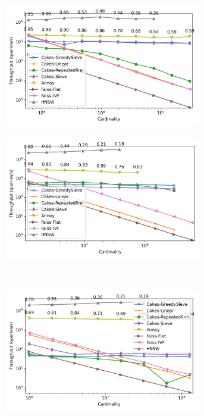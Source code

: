 \begin{figure}
\begin{subfigure}[b]{0.47\textwidth}
\includegraphics[width=0.95\textwidth]{plots/fashion-mnist-knn-10.png}
\label{fig:results:fashion-mnist-scaling}
\end{subfigure}%
\begin{subfigure}[b]{0.47\textwidth}
\includegraphics[width=0.95\textwidth]{plots/glove-25-knn-10.png}
\label{fig:results:glove-25-scaling}
\end{subfigure}%
\vspace{1em}
\\
\begin{subfigure}[b]{0.47\textwidth}
\includegraphics[width=0.95\textwidth]{plots/sift-knn-10.png}

\end{subfigure}
\end{figure}
